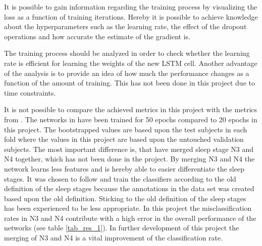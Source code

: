 It is possible to gain information regarding the training process by visualizing the loss as a function of training iterations. 
Hereby it is possible to achieve knowledge about the hyperparameters such as the learning rate, the effect of the dropout operations and how accurate the estimate of the gradient is. %

The training process should be analyzed in order to check whether the learning rate is efficient for learning the weights of the new LSTM cell.
Another advantage of the analysis is to provide an idea of how much the performance changes as a function of the amount of training. This has not been done in this project due to time constraints.

It is not possible to compare the achieved metrics in this project with the metrics from \cite{main_ar}. 
The networks in \cite{main_ar} have been trained for 50 epochs compared to 20 epochs in this project. The bootstrapped values are based upon the test subjects in each fold where the values in this project are based upon the untouched validation subjects. 
The most important difference is, that \cite{main_ar} have merged sleep stage N3 and N4 together, which has not been done in the project. By merging N3 and N4 the network learns less features and is hereby able to easier differentiate the sleep stages. 
It was chosen to follow and train the classifiers according to the old definition of the sleep stages because the annotations in the data set was created based upon the old definition. Sticking to the old definition of the sleep stages has been experienced to be less appropriate.
In this project the misclassification rates in N3 and N4 contribute with a high error in the overall performance of the networks (see table \ref{tab_res_1}).
In further development of this project the merging of N3 and N4 is a vital improvement of the classification rate.
